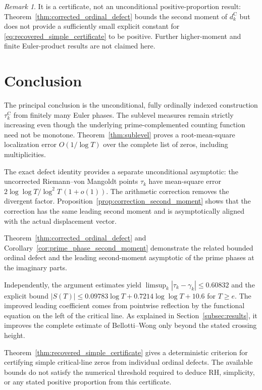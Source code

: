 \documentclass[11pt,a4paper]{article}
\makeatletter
\numberwithin{equation}{section}
\DeclareRobustCommand{\CGref}[1]{\ref{#1}}
\DeclareRobustCommand{\CGeqref}[1]{\eqref{#1}}
\let\CG@origref\ref
\let\CG@origeqref\eqref
\newcommand{\CG@gettip}[1]{\@ifundefined{CGTip@#1}{#1}{\csname CGTip@#1\endcsname}}
\DeclareRobustCommand{\CGref}[1]{\pdftooltip{\CG@origref{#1}}{\CG@gettip{#1}}}
\DeclareRobustCommand{\CGeqref}[1]{\pdftooltip{\CG@origeqref{#1}}{\CG@gettip{#1}}}
\theoremstyle{definition}
\theoremstyle{remark}
\newtheorem{remark}[theorem]{Remark}
\makeatother
\begin{document}
\begin{remark}\label{rem:certificate_scope}
It is a certificate, not an unconditional positive-proportion result:
Theorem~\CGref{thm:corrected_ordinal_defect} bounds the second moment
of $d_k^{\mathrm C}$ but does not provide a sufficiently small explicit
constant for \CGeqref{eq:recovered_simple_certificate} to be positive.
Further higher-moment and finite Euler-product results are not claimed here.
\end{remark}

\section{Conclusion}\label{sec:conclusion}
The principal conclusion is the unconditional, fully ordinally indexed
construction $\tau_k^{\mathrm C}$ from finitely many Euler phases.
The sublevel measures remain strictly increasing even though the
underlying prime-complemented counting function need not be monotone.
Theorem~\CGref{thm:sublevel} proves a root-mean-square localization error
$O(1/\log T)$ over the complete list of zeros, including multiplicities.

The exact defect identity provides a separate unconditional asymptotic:
the uncorrected Riemann--von Mangoldt points $\tau_k$ have mean-square error
$2\log\log T/\log^2T\,(1+o(1))$. The arithmetic correction removes the
divergent factor. Proposition~\CGref{prop:correction_second_moment} shows that
the correction has the same leading second moment and is asymptotically aligned with
the actual displacement vector.

Theorem~\CGref{thm:corrected_ordinal_defect}
and Corollary~\CGref{cor:prime_phase_second_moment} demonstrate the related
bounded ordinal defect and the leading second-moment asymptotic of the prime phases
at the imaginary parts.

Independently, the argument estimates yield
$\limsup_k|\tau_k-\gamma_k|\le0.60832$ and the explicit bound
$|S(T)|\le0.09783\log T+0.7214\log\log T+10.6$ for $T\ge e$.
The improved leading coefficient comes from pointwise reflection by the
functional equation on the left of the critical line. As explained in
Section~\CGref{subsec:results}, it improves the complete estimate of
Bellotti--Wong only beyond the stated crossing height.

Theorem~\CGref{thm:recovered_simple_certificate} gives a deterministic criterion for certifying simple
critical-line zeros from individual ordinal defects. The available bounds
do not satisfy the numerical threshold required to deduce RH, simplicity,
or any stated positive proportion from this certificate.
\end{document}
